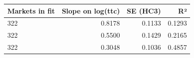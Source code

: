 \begin{tabular}{lrrr}
\toprule
Markets in fit & Slope on log(ttc) & SE (HC3) & R² \\
\midrule
322 & 0.8178 & 0.1133 & 0.1293 \\
322 & 0.5500 & 0.1429 & 0.2165 \\
322 & 0.3048 & 0.1036 & 0.4857 \\
\bottomrule
\end{tabular}

